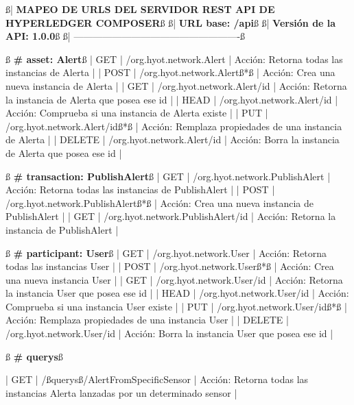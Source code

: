 \documentclass[12pt,a4paper, twoside]{report}
\begin{document}
\begin{listing}[style=consola, basicstyle=\ttfamily\scriptsize, numbers=none, escapechar=ß]
ß{\color{ballblue}| \textbf{MAPEO DE URLS DEL SERVIDOR REST API DE HYPERLEDGER COMPOSER}}ß
ß{\color{ballblue}| \textbf{URL base: /api}}ß
ß{\color{ballblue}| \textbf{Versión de la API: 1.0.0}}ß
ß{\color{ballblue}| ----------------------------------------------------}ß

ß\textbf{{\color{maroon} \# \Gls{asset}: Alert}}ß
| GET    | /org.hyot.network.Alert         | Acción: Retorna todas las instancias de Alerta           |
| POST   | /org.hyot.network.Alertß{\color{red}*}ß        | Acción: Crea una nueva instancia de Alerta               |
| GET    | /org.hyot.network.Alert/{id}    | Acción: Retorna la instancia de Alerta que posea ese id  |
| HEAD   | /org.hyot.network.Alert/{id}    | Acción: Comprueba si una instancia de Alerta existe      |
| PUT    | /org.hyot.network.Alert/{id}ß{\color{red}*}ß   | Acción: Remplaza propiedades de una instancia de Alerta  |
| DELETE | /org.hyot.network.Alert/{id}    | Acción: Borra la instancia de Alerta que posea ese id    |
 
 ß\textbf{{\color{maroon} \# \Gls{transaction}: PublishAlert}}ß
| GET    | /org.hyot.network.PublishAlert  | Acción: Retorna todas las instancias de PublishAlert     |
| POST   | /org.hyot.network.PublishAlertß{\color{red}*}ß | Acción: Crea una nueva instancia de PublishAlert         |
| GET    | /org.hyot.network.PublishAlert/{id} | Acción: Retorna la instancia de PublishAlert         |

ß\textbf{{\color{maroon} \# \Gls{participant}: User}}ß
| GET    | /org.hyot.network.User          | Acción: Retorna todas las instancias User                |
| POST   | /org.hyot.network.Userß{\color{red}*}ß         | Acción: Crea una nueva instancia User                    |
| GET    | /org.hyot.network.User/{id}     | Acción: Retorna la instancia User que posea ese id       |
| HEAD   | /org.hyot.network.User/{id}     | Acción: Comprueba si una instancia User existe           |
| PUT    | /org.hyot.network.User/{id}ß{\color{red}*}ß    | Acción: Remplaza propiedades de una instancia User       |
| DELETE | /org.hyot.network.User/{id}     | Acción: Borra la instancia User que posea ese id         |
 
ß\textbf{{\color{maroon} \# \Glspl{query}}}ß

| GET    | /ß\glspl{query}ß/AlertFromSpecificSensor | Acción: Retorna todas las instancias Alerta lanzadas por un determinado sensor |
 

\end{listing}
\end{document}
